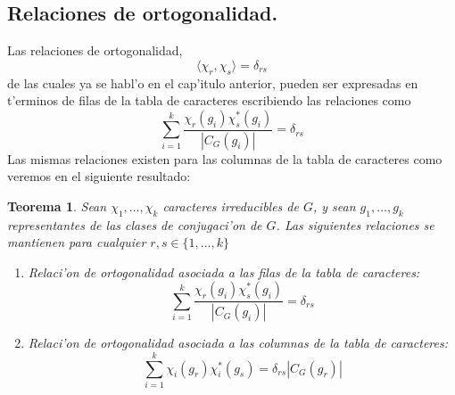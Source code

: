 \documentclass[a4paper,openright,12pt]{book}
\numberwithin{equation}{section} %
\newtheorem{teorema}{Teorema}[section] %
\begin{document}
\subsection{Relaciones de ortogonalidad.}
Las relaciones de ortogonalidad,
\[
\langle \chi_{r}, \chi_{s} \rangle = \delta_{rs}
\]
de las cuales ya se habl'o en el cap'itulo anterior, pueden ser expresadas en t'erminos de filas de la tabla de caracteres escribiendo las relaciones como
\[
\sum_{i=1}^{k}\frac{\chi_{r}(g_{i})\chi_{s}^{*}(g_{i})}{|C_{G}(g_{i})|}=\delta_{rs}
\]
Las mismas relaciones existen para las columnas de la tabla de caracteres como veremos en el siguiente resultado:
\begin{teorema}
Sean $\chi_{1}, \ldots,\chi_{k}$ caracteres irreducibles de $G$, y sean $g_{1},\ldots ,g_{k}$ representantes de las clases de conjugaci'on de $G$. Las siguientes relaciones se mantienen para cualquier $r, s \in \{1, \ldots ,k\}$
\begin{enumerate}
\item Relaci'on de ortogonalidad asociada a las filas de la tabla de caracteres:
\[
\sum_{i=1}^{k}\frac{\chi_{r}(g_{i})\chi_{s}^{*}(g_{i})}{|C_{G}(g_{i})|}=\delta_{rs}
\]
\item Relaci'on de ortogonalidad asociada a las columnas de la tabla de caracteres:
\[
\sum_{i=1}^{k}\chi_{i}(g_{r})\chi_{i}^{*}(g_{s})=\delta_{rs}|C_{G}(g_{r})|
\]
\end{enumerate}
\end{teorema}
\end{document}

